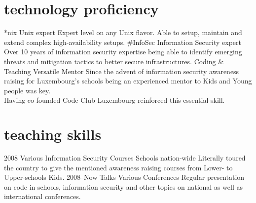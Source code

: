 \documentclass[]{friggeri-cv} %
\begin{document}
\section{technology proficiency}

\begin{entrylist}
\entry
{*nix}
{Unix expert}
{}
{Expert level on any Unix flavor. Able to setup, maintain and extend complex high-availability setups.}
\entry
{\#InfoSec}
{Information Security expert}
{}
{Over 10 years of information security expertise being able to identify emerging threats and mitigation tactics to better secure infrastructures.}
\entry
{Coding \& Teaching}
{Versatile Mentor}
{}
{Since the advent of information security awareness raising for Luxembourg's schools being an experienced mentor to Kids and Young people was key. \\
Having co-founded Code Club Luxembourg reinforced this essential skill.}
\end{entrylist}


\section{teaching skills}

\begin{entrylist}
\entry
{2008}
{Various Information Security Courses}
{Schools nation-wide}
{Literally toured the country to give the mentioned awareness raising courses from Lower- to Upper-schools Kids.}
\entry
{2008--Now}
{Talks}
{Various Conferences}
{Regular presentation on code in schools, information security and other topics on national as well as international conferences.}
\end{entrylist}

\end{document}
